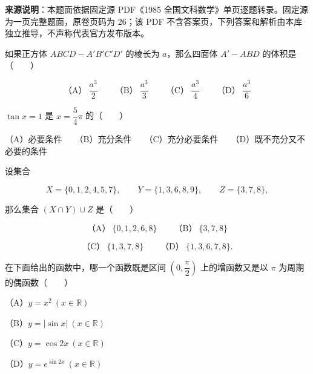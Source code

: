 


\begin{gktip}
\textbf{来源说明}：本题面依据固定源 PDF《1985 全国文科数学》单页逐题转录。固定源为一页完整题面，原卷页码为 26；该 PDF 不含答案页，下列答案和解析由本库独立推导，不声称代表官方发布版本。
\end{gktip}

\begin{question}
如果正方体 $ABCD-A'B'C'D'$ 的棱长为 $a$，那么四面体 $A'-ABD$ 的体积是\mbox{（　　）}

\nopagebreak[4]
\[
\text{（A）}\ \frac{a^3}{2}
\qquad
\text{（B）}\ \frac{a^3}{3}
\qquad
\text{（C）}\ \frac{a^3}{4}
\qquad
\text{（D）}\ \frac{a^3}{6}
\]

\end{question}
\begin{question}
$\tan x=1$ 是 $x=\dfrac54\pi$ 的\mbox{（　　）}

（A）必要条件　　（B）充分条件　　（C）充分必要条件　　（D）既不充分又不必要的条件

\end{question}
\begin{question}
设集合

\nopagebreak[4]
\[
X=\{0,1,2,4,5,7\},\qquad
Y=\{1,3,6,8,9\},\qquad
Z=\{3,7,8\},
\]

那么集合 $(X\cap Y)\cup Z$ 是\mbox{（　　）}

\nopagebreak[4]
\[
\text{（A）}\ \{0,1,2,6,8\}
\qquad
\text{（B）}\ \{3,7,8\}
\]

\nopagebreak[4]
\[
\text{（C）}\ \{1,3,7,8\}
\qquad
\text{（D）}\ \{1,3,6,7,8\}.
\]

\end{question}
\begin{question}
在下面给出的函数中，哪一个函数既是区间 $\left(0,\dfrac\pi2\right)$ 上的增函数又是以 $\pi$ 为周期的偶函数\mbox{（　　）}

（A）$y=x^2\ (x\in\mathbb R)$

（B）$y=|\sin x|\ (x\in\mathbb R)$

（C）$y=\cos2x\ (x\in\mathbb R)$

（D）$y=e^{\sin2x}\ (x\in\mathbb R)$

\end{question}
